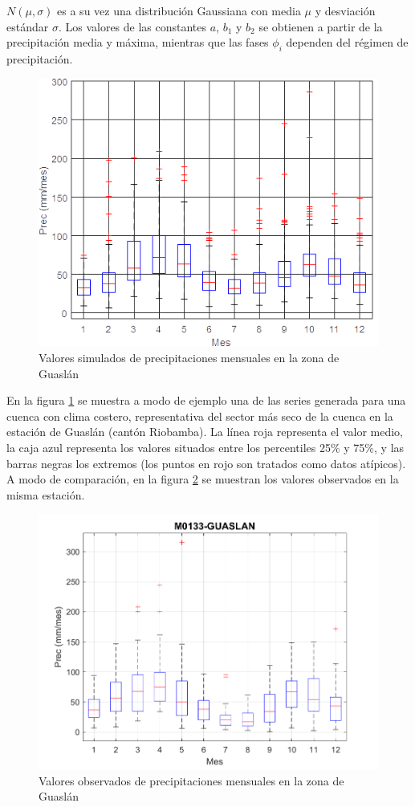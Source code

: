 $N(\mu,\sigma)$ es a su vez una distribución Gaussiana con media $\mu$ y desviación estándar $\sigma$. 
Los valores de las constantes $a$, $b_1$ y $b_2$ se obtienen a partir de la precipitación media y máxima, 
mientras que las fases $\phi_i$ dependen del régimen de precipitación.

\begin{figure}[h!]
    \begin{center}
      \includegraphics[height=3.in]{Figures/prec_sim.png}
      \caption{ Valores simulados de precipitaciones mensuales en la zona de Guaslán}
      \label{2}
    \end{center}
  \end{figure}


En la figura \ref{2} se muestra a modo de ejemplo una de las series generada para una cuenca con clima costero, representativa del sector más 
seco de la cuenca en la estación de Guaslán (cantón Riobamba). La línea roja representa el valor medio, la caja azul representa los valores situados entre los percentiles
 25$\%$ y 75$\%$, y las barras negras los extremos (los puntos en rojo son tratados como datos atípicos). A modo de comparación,
 en la figura \ref{3} se muestran los valores observados en la misma estación.

 \begin{figure}[h!]
    \begin{center}
      \includegraphics[height=3.in]{Figures/prec_obs.png}
      \caption{ Valores observados de precipitaciones mensuales en la zona de Guaslán}
      \label{3}
    \end{center}
  \end{figure}

